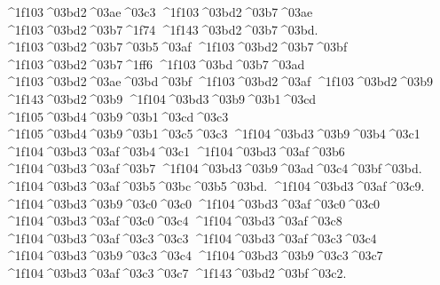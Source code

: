 {	^^^^1f103^^^^03bd2^^^^03ae^^^^03c3
	^^^^1f103^^^^03bd2^^^^03b7^^^^03ae		%
	^^^^1f103^^^^03bd2^^^^03b7^^^^1f74
	^^^^1f143^^^^03bd2^^^^03b7^^^^03bd.		%
	^^^^1f103^^^^03bd2^^^^03b7^^^^03b5^^^^03af  		%
	^^^^1f103^^^^03bd2^^^^03b7^^^^03bf
	^^^^1f103^^^^03bd2^^^^03b7^^^^1ff6
	^^^^1f103^^^^03bd^^^^03b7^^^^03ad
	^^^^1f103^^^^03bd2^^^^03ae^^^^03bd^^^^03bf   		%
	^^^^1f103^^^^03bd2^^^^03af
	^^^^1f103^^^^03bd2^^^^03b9
	^^^^1f143^^^^03bd2^^^^03b9
		^^^^1f104^^^^03bd3^^^^03b9^^^^03b1^^^^03cd  		%
			^^^^1f105^^^^03bd4^^^^03b9^^^^03b1^^^^03cd^^^^03c3  		%
			^^^^1f105^^^^03bd4^^^^03b9^^^^03b1^^^^03c5^^^^03c3 
		^^^^1f104^^^^03bd3^^^^03b9^^^^03b4^^^^03c1    		%
		^^^^1f104^^^^03bd3^^^^03af^^^^03b4^^^^03c1		%
		^^^^1f104^^^^03bd3^^^^03af^^^^03b6   		%
		^^^^1f104^^^^03bd3^^^^03af^^^^03b7   		%
		^^^^1f104^^^^03bd3^^^^03b9^^^^03ad^^^^03c4^^^^03bf^^^^03bd.
		^^^^1f104^^^^03bd3^^^^03af^^^^03b5^^^^03bc^^^^03b5^^^^03bd.
		^^^^1f104^^^^03bd3^^^^03af^^^^03c9.
		^^^^1f104^^^^03bd3^^^^03b9^^^^03c0^^^^03c0   		%
		^^^^1f104^^^^03bd3^^^^03af^^^^03c0^^^^03c0  		%
		^^^^1f104^^^^03bd3^^^^03af^^^^03c0^^^^03c4  		%
		^^^^1f104^^^^03bd3^^^^03af^^^^03c8
		^^^^1f104^^^^03bd3^^^^03af^^^^03c3^^^^03c3  		%
		^^^^1f104^^^^03bd3^^^^03af^^^^03c3^^^^03c4  		%
		^^^^1f104^^^^03bd3^^^^03b9^^^^03c3^^^^03c4
		^^^^1f104^^^^03bd3^^^^03b9^^^^03c3^^^^03c7   		%
		^^^^1f104^^^^03bd3^^^^03af^^^^03c3^^^^03c7  		%
	^^^^1f143^^^^03bd2^^^^03bf^^^^03c2.		%
}
